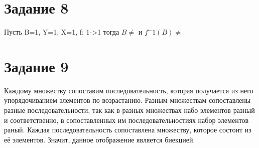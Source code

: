 \documentclass[a4paper, 12pt]{article}
\begin{document}
	\section*{Задание 8}
		Пусть B={1}, Y={1}, X={1}, f: 1->1
		тогда $B\neq{}$ и $f^-1$$(B)\neq {}$
	\section*{Задание 9}
		Каждому множеству сопоставим последовательность, которая получается из него упорядочиванием элементов по возрастанию. Разным множествам сопоставлены разные последовательности, так как в разных множествах набо элементов разный и соответственно, в сопоставленных им последовательностиях набор элементов раный. Каждая последовательность сопоставлена множеству, которое состоит из её элементов. Значит, данное отображение является биекцией.
\end{document}
